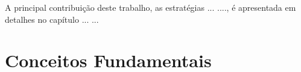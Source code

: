 \documentclass[
    12pt,                %
    oneside,            %
    a4paper,            %
    english,            %
    brazil                %
    ]{abntex2ppgsi}
\begin{document}
A principal contribuição deste trabalho, as estratégias ... ...., é apresentada em detalhes no capítulo ... ...



\chapter{Conceitos Fundamentais}
\label{ch:conceitos}



\end{document}
